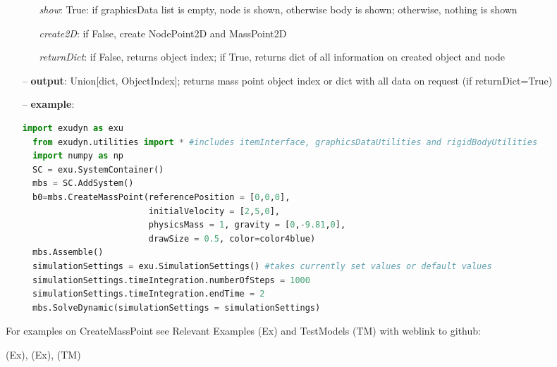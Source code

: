 \begin{itemize}[leftmargin=0.7cm]
\begin{itemize}[leftmargin=1.2cm]
\item[]{\it show}: True: if graphicsData list is empty, node is shown, otherwise body is shown; otherwise, nothing is shown
\item[]{\it create2D}: if False, create NodePoint2D and MassPoint2D
\item[]{\it returnDict}: if False, returns object index; if True, returns dict of all information on created object and node
\end{itemize}
\item[--]
{\bf output}: Union[dict, ObjectIndex]; returns mass point object index or dict with all data on request (if returnDict=True)
\item[--]
{\bf example}: \vspace{-12pt}\ei\begin{lstlisting}[language=Python, xleftmargin=36pt]
  import exudyn as exu
  from exudyn.utilities import * #includes itemInterface, graphicsDataUtilities and rigidBodyUtilities
  import numpy as np
  SC = exu.SystemContainer()
  mbs = SC.AddSystem()
  b0=mbs.CreateMassPoint(referencePosition = [0,0,0],
                         initialVelocity = [2,5,0],
                         physicsMass = 1, gravity = [0,-9.81,0],
                         drawSize = 0.5, color=color4blue)
  mbs.Assemble()
  simulationSettings = exu.SimulationSettings() #takes currently set values or default values
  simulationSettings.timeIntegration.numberOfSteps = 1000
  simulationSettings.timeIntegration.endTime = 2
  mbs.SolveDynamic(simulationSettings = simulationSettings)
\end{lstlisting}\vspace{-24pt}\bi\item[]\vspace{-24pt}\vspace{12pt}\end{itemize}
%

%
\noindent For examples on CreateMassPoint see Relevant Examples (Ex) and TestModels (TM) with weblink to github:
\bi
 \item \footnotesize {} (Ex), 
 (Ex), 
 (TM)
\ei

